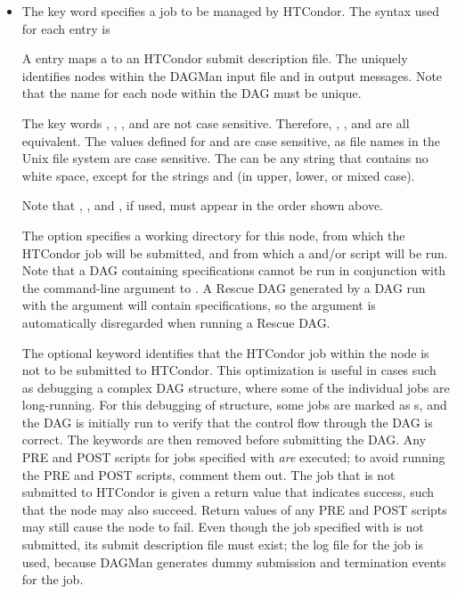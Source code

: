 \begin{itemize}

\label{dagman:JOB}
\item {}

The  key word specifies a job to be managed by HTCondor.
The syntax used for each  entry is

  
  

A  entry maps a  to an HTCondor submit description file.
The  uniquely identifies nodes within the
DAGMan input file and in output messages.
Note that the name for each node within the DAG
must be unique.

The key words , , , and 
are not case sensitive.
Therefore, , , and  are all equivalent.
The values defined for  and 
are case sensitive, as file names in
the Unix file system are case sensitive.
The  can be any string that contains no white space, except
for the strings  and  (in upper, lower, or mixed
case).

Note that , , and , if used, must appear
in the order shown above.

The  option specifies a working directory
for this node,
from which the HTCondor job will be submitted,
and from which a  and/or
 script will be run.
Note that a DAG containing  specifications cannot
be run in conjunction with the  command-line
argument to .  A Rescue DAG generated by
a DAG run with the  argument will contain
 specifications, so the  argument is
automatically disregarded when running a Rescue DAG.

\label{dagman:NOOP}
The optional  keyword identifies that the HTCondor job within
the node is not to be submitted to HTCondor.
This optimization is useful in cases such as debugging a complex DAG structure,
where some of the individual jobs are long-running.
For this debugging of structure,
some jobs are marked as s, and
the DAG is initially run to verify that the control flow through
the DAG is correct.
The  keywords are then removed before submitting the DAG.
Any PRE and POST scripts
for jobs specified with  \emph{are} executed;
to avoid running the PRE and POST scripts, comment them out.
The job that is not submitted to HTCondor is given a return value that indicates
success, such that the node may also succeed.
Return values of any 
PRE and POST scripts may still cause the node to fail.
Even though the job specified with  is not submitted,
its submit description file must exist;
the log file for the job is used, 
because DAGMan generates dummy submission and termination events for the job.


\end{itemize}
